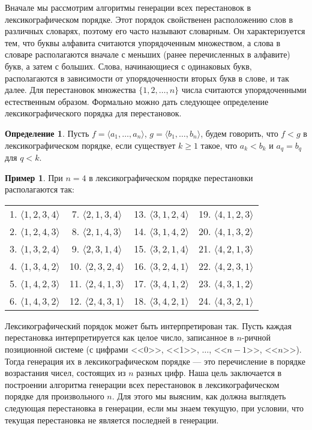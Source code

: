 \documentclass[12pt,a4paper]{article}
\theoremstyle{plain}
\theoremstyle{definition}
\newtheorem{definition}{Определение}
\newtheorem*{example}{Пример}
\theoremstyle{remark}
\begin{document}
Вначале мы рассмотрим алгоритмы генерации всех перестановок в лексикографическом порядке. Этот порядок свойственен расположению слов в различных словарях, поэтому его часто называют словарным. Он характеризуется тем, что буквы алфавита считаются упорядоченным множеством, а слова в словаре располагаются вначале с меньших (ранее перечисленных в алфавите) букв, а затем с больших. Слова, начинающиеся с одинаковых букв, располагаются в зависимости от упорядоченности вторых букв в слове, и так далее. Для перестановок множества $\{1,2,\ldots,n\}$ числа считаются упорядоченными естественным образом. Формально можно дать следующее определение лексикографического порядка для перестановок.

\begin{definition}
Пусть $f=\langle a_1,\ldots,a_n\rangle$, $g=\langle b_1,\ldots,b_n\rangle$, будем говорить, что $f<g$ в лексикографическом порядке, если существует $k\ge 1$ такое, что $a_k<b_k$ и $a_q=b_q$ для $q<k$.
\end{definition}

\begin{example}
При $n=4$ в лексикографическом порядке перестановки располагаются так:

\begin{tabular}{cccc}
1. $\langle1, 2, 3, 4\rangle$ & 7. $\langle2, 1, 3, 4\rangle$ & 13. $\langle3, 1, 2, 4\rangle$ & 19. $\langle4, 1, 2, 3\rangle$ \\
2. $\langle1, 2, 4, 3\rangle$ & 8. $\langle2, 1, 4, 3\rangle$ & 14. $\langle3, 1, 4, 2\rangle$ & 20. $\langle4, 1, 3, 2\rangle$ \\
3. $\langle1, 3, 2, 4\rangle$ & 9. $\langle2, 3, 1, 4\rangle$ & 15. $\langle3, 2, 1, 4\rangle$ & 21. $\langle4, 2, 1, 3\rangle$ \\
4. $\langle1, 3, 4, 2\rangle$ & 10. $\langle2, 3, 2, 4\rangle$ & 16. $\langle3, 2, 4, 1\rangle$ & 22. $\langle4, 2, 3, 1\rangle$ \\
5. $\langle1, 4, 2, 3\rangle$ & 11. $\langle2, 4, 1, 3\rangle$ & 17. $\langle3, 4, 1, 2\rangle$ & 23. $\langle4, 3, 1, 2\rangle$ \\
6. $\langle1, 4, 3, 2\rangle$ & 12. $\langle2, 4, 3, 1\rangle$ & 18. $\langle3, 4, 2, 1\rangle$ & 24. $\langle4, 3, 2, 1\rangle$ \\
\end{tabular}
\end{example}

Лексикографический порядок может быть интерпретирован так. Пусть каждая перестановка интерпретируется как целое число, записанное в $n$-ричной позиционной системе (с цифрами <<0>>, <<1>>, $\ldots$, <<$n-1$>>, <<$n$>>). Тогда генерация их в лексикографическом порядке --- это перечисление в порядке возрастания чисел, состоящих из $n$ разных цифр. Наша цель заключается в построении алгоритма генерации всех перестановок в лексикографическом порядке для произвольного $n$. Для этого мы выясним, как должна выглядеть следующая перестановка в генерации, если мы знаем текущую, при условии, что текущая перестановка не является последней в генерации.
\end{document}
